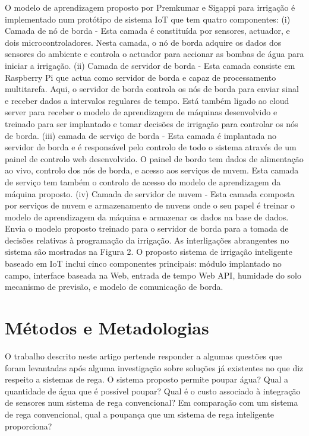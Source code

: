 \documentclass[conference]{IEEEtran}
\begin{document}
O modelo de aprendizagem proposto por Premkumar e Sigappi \cite{premkumar2022iot} para irrigação é implementado num protótipo 
de sistema IoT que tem quatro componentes: (i) Camada de nó de borda - 
Esta camada é constituída por sensores, actuador, e dois microcontroladores. 
Nesta camada, o nó de borda adquire os dados dos sensores do ambiente e controla 
o actuador para accionar as bombas de água para iniciar a irrigação. 
(ii) Camada de servidor de borda - Esta camada consiste em Raspberry Pi que 
actua como servidor de borda e capaz de processamento multitarefa. Aqui, o 
servidor de borda controla os nós de borda para enviar sinal e receber dados 
a intervalos regulares de tempo. Está também ligado ao cloud server para receber 
o modelo de aprendizagem de máquinas desenvolvido e treinado para ser implantado 
e tomar decisões de irrigação para controlar os nós de borda. 
(iii) camada de serviço de borda - Esta camada é implantada no servidor de 
borda e é responsável pelo controlo de todo o sistema através de um painel de 
controlo web desenvolvido. O painel de bordo tem dados de alimentação ao vivo, 
controlo dos nós de borda, e acesso aos serviços de nuvem. Esta camada de 
serviço tem também o controlo de acesso do modelo de aprendizagem da máquina 
proposto. (iv) Camada de servidor de nuvem - Esta camada composta por serviços 
de nuvem e armazenamento de nuvens onde o seu papel é treinar o modelo de 
aprendizagem da máquina e armazenar os dados na base de dados. Envia o modelo 
proposto treinado para o servidor de borda para a tomada de decisões relativas 
à programação da irrigação. As interligações abrangentes no sistema são mostradas 
na Figura 2. O proposto sistema de irrigação inteligente baseado em IoT inclui 
cinco componentes principais: módulo implantado no campo, interface baseada na Web, 
entrada de tempo Web API, humidade do solo mecanismo de previsão, e modelo de 
comunicação de borda.


\section{Métodos e Metadologias}

O trabalho descrito neste artigo pertende responder a algumas questões que foram 
levantadas após alguma investigação sobre soluções já existentes no que diz respeito 
a sistemas de rega. O sistema proposto permite poupar água? Qual a quantidade de água 
que é possível poupar?  Qual é o custo associado à integração de sensores num sistema 
de rega convencional? Em comparação com um sistema de rega convencional, 
qual a poupança que um sistema de rega inteligente proporciona?
\end{document}

